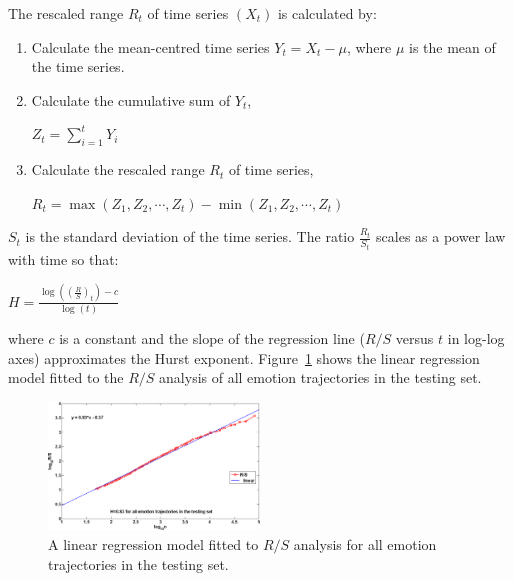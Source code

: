\documentclass[10pt,journal,cspaper,compsoc]{IEEEtran}
\begin{document}
\noindent The rescaled range $R_{t}$ of time series $(X_{t})$ is calculated by:

\begin{enumerate}
\item Calculate the mean-centred time series $Y_{t}=X_{t}-\mu$, where $\mu$ is the mean of the time series.
\item Calculate the cumulative sum of $Y_{t}$,
\begin{center}
$Z_{t}=\sum \limits_{i=1}^t Y_{i}$
\end{center}
\item Calculate the rescaled range $R_{t}$ of time series,
\begin{center}
$R_{t}=\max(Z_{1}, Z_{2}, \cdots, Z_{t}) - \min(Z_{1}, Z_{2}, \cdots, Z_{t})$
\end{center}
\end{enumerate}

\noindent $S_{t}$ is the standard deviation of the time series. The ratio $\frac{R_{t}}{S_{t}}$ scales as a power law with time so that:
\begin{center}
$H=\frac{\log \left( \left( \frac{R}{S} \right) _{t} \right) - c}{\log(t)}$
\end{center}
\noindent where $c$ is a constant and the slope of the regression line ($R/S$ versus $t$ in log-log axes) approximates the Hurst exponent. Figure~\ref{fig_hurst_slope} shows the linear regression model fitted to the $R/S$ analysis of all emotion trajectories in the testing set.

\begin{figure}[!htp]
\centering
\includegraphics[width=0.5\textwidth]{figures/Ch7/hurst_slope.png}
\caption{A linear regression model fitted to $R/S$ analysis for all emotion trajectories in the testing set.}
\label{fig_hurst_slope}
\end{figure}
\end{document}

